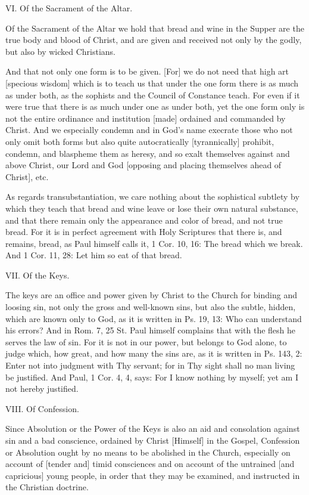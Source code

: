VI. Of the Sacrament of the Altar.

Of the Sacrament of the Altar we hold that bread and wine in
the Supper are the true body and blood of Christ, and are
given and received not only by the godly, but also by wicked
Christians.

And that not only one form is to be given. [For] we do not
need that high art [specious wisdom] which is to teach us that
under the one form there is as much as under both, as the
sophists and the Council of Constance teach. For even if it
were true that there is as much under one as under both, yet
the one form only is not the entire ordinance and institution
[made] ordained and commanded by Christ. And we especially
condemn and in God's name execrate those who not only omit
both forms but also quite autocratically [tyrannically]
prohibit, condemn, and blaspheme them as heresy, and so exalt
themselves against and above Christ, our Lord and God
[opposing and placing themselves ahead of Christ], etc.

As regards transubstantiation, we care nothing about the
sophistical subtlety by which they teach that bread and wine
leave or lose their own natural substance, and that there
remain only the appearance and color of bread, and not true
bread. For it is in perfect agreement with Holy Scriptures
that there is, and remains, bread, as Paul himself calls it,
1 Cor. 10, 16: The bread which we break. And 1 Cor. 11, 28:
Let him so eat of that bread.


VII. Of the Keys.

The keys are an office and power given by Christ to the Church
for binding and loosing sin, not only the gross and well-known
sins, but also the subtle, hidden, which are known only to
God, as it is written in Ps. 19, 13: Who can understand his
errors? And in Rom. 7, 25 St. Paul himself complains that with
the flesh he serves the law of sin. For it is not in our
power, but belongs to God alone, to judge which, how great,
and how many the sins are, as it is written in Ps. 143, 2:
Enter not into judgment with Thy servant; for in Thy sight
shall no man living be justified. And Paul, 1 Cor. 4, 4, says:
For I know nothing by myself; yet am I not hereby justified.

VIII. Of Confession.

Since Absolution or the Power of the Keys is also an aid and
consolation against sin and a bad conscience, ordained by
Christ [Himself] in the Gospel, Confession or Absolution ought
by no means to be abolished in the Church, especially on
account of [tender and] timid consciences and on account of
the untrained [and capricious] young people, in order that
they may be examined, and instructed in the Christian
doctrine.

